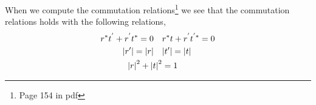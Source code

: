 \documentclass[a4paper]{tufte-handout} %
\begin{document}
When we compute the commutation relations\footnote{Page 154 in pdf}
we see that the commutation relations holds with the following relations,
\begin{align*}
    r^*t^{'} + r^{'}t^* = 0 \quad& r^*t + r^{'}t^{'*} = 0 \\
    \abs{r'} = \abs{r} \quad& \abs{t'} = \abs{t} \\ 
    \abs{r}^2 + \abs{t}^2 &= 1
\end{align*}
\end{document}
